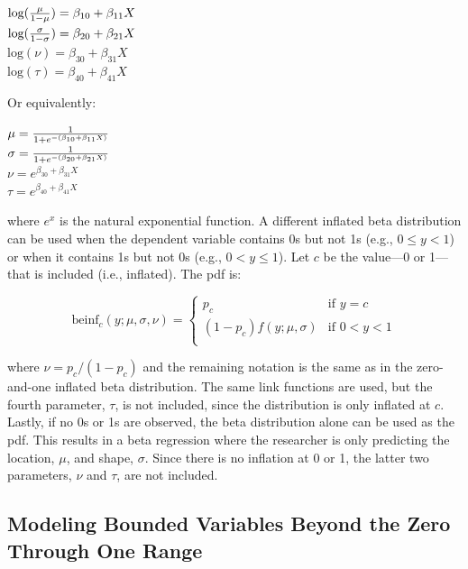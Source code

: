 \documentclass[english,,man]{apa6}
\begin{document}
\begin{center}
$\text{log}({\mu \over 1 - \mu}) = \beta_{10} + \beta_{11}X$\\
$\text{log}({\sigma \over 1 - \sigma}) = \beta_{20} + \beta_{21}X$\\
$\text{log}(\nu) = \beta_{30} + \beta_{31}X$\\
$\text{log}(\tau) = \beta_{40} + \beta_{41}X$
\end{center}

Or equivalently:

\begin{center}
$\mu={1\over1+e^{-(\beta_{10}+\beta_{11}X)}}$\\
$\sigma={1\over1+e^{-(\beta_{20}+\beta_{21}X)}}$\\
$\nu = e^{\beta_{30} + \beta_{31}X}$\\
$\tau = e^{\beta_{40} + \beta_{41}X}$
\end{center}

where \(e^x\) is the natural exponential function. A different inflated beta distribution can be used when the dependent variable contains 0s but not 1s (e.g., \(0 \leq y < 1\)) or when it contains 1s but not 0s (e.g., \(0 < y \leq 1\)). Let \(c\) be the value---0 or 1---that is included (i.e., inflated). The pdf is:

\begin{center}
\[
\text{beinf}_c(y;\mu,\sigma,\nu) =
\begin{cases}
  p_c                             & \text{if } y = c\\
  (1 - p_c)f(y;\mu,\sigma)        & \text{if } 0 < y < 1\\
\end{cases}
\]
\end{center}

where \(\nu = p_c / (1 - p_c)\) and the remaining notation is the same as in the zero-and-one inflated beta distribution. The same link functions are used, but the fourth parameter, \(\tau\), is not included, since the distribution is only inflated at \(c\). Lastly, if no 0s or 1s are observed, the beta distribution alone can be used as the pdf. This results in a beta regression where the researcher is only predicting the location, \(\mu\), and shape, \(\sigma\). Since there is no inflation at 0 or 1, the latter two parameters, \(\nu\) and \(\tau\), are not included.

\hypertarget{modeling-bounded-variables-beyond-the-zero-through-one-range}{%
\subsection{Modeling Bounded Variables Beyond the Zero Through One Range}\label{modeling-bounded-variables-beyond-the-zero-through-one-range}}
\end{document}
